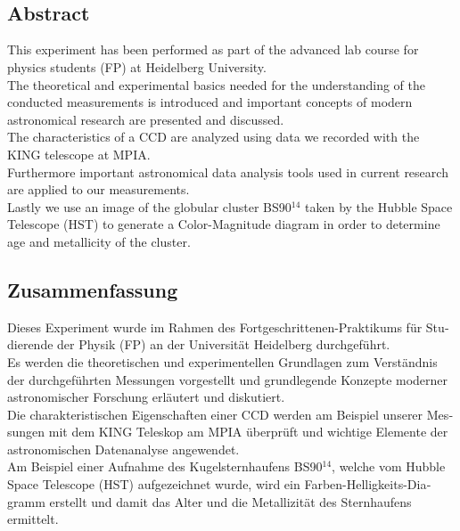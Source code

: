 \makeatletter

\begin{centering}
\textbf{\Large\@title} \\
\vspace{.1cm}
\small\@author \\
\end{centering}

\makeatother

\vfill
 
{\let\raggedsection\centering
\begin{centering}
\section*{Abstract }
\end{centering}
This experiment has been performed as part of the advanced lab course for physics students (FP) at Heidelberg University. \\
The theoretical and experimental basics needed for the understanding of the conducted measurements is introduced and important concepts of modern astronomical research are presented and discussed.\\
The characteristics of a CCD are analyzed using data we recorded with the KING telescope at MPIA. \\
Furthermore important astronomical data analysis tools used in current research are applied to our measurements. \\
Lastly we use an image of the globular cluster BS90$^{14}$ taken by the Hubble Space Telescope (HST) to generate a Color-Magnitude diagram in order to determine age and metallicity of the cluster.


\vfill
\begin{german}
\begin{centering}
\section*{Zusammenfassung}
\end{centering}
Dieses Experiment wurde im Rahmen des Fortgeschrittenen-Praktikums für Studierende der Physik (FP) an der Universität Heidelberg durchgeführt. \\
Es werden die theoretischen und experimentellen Grundlagen zum Verständnis der durchgeführten Messungen vorgestellt und grundlegende Konzepte moderner astronomischer Forschung erläutert und diskutiert. \\
Die charakteristischen Eigenschaften einer CCD werden am Beispiel unserer Messungen mit dem KING Teleskop am MPIA überprüft und wichtige Elemente der astronomischen Datenanalyse angewendet. \\
Am Beispiel einer Aufnahme des Kugelsternhaufens BS90$^{14}$, welche vom Hubble Space Telescope (HST) aufgezeichnet wurde, wird ein Farben-Helligkeits-Diagramm erstellt und damit das Alter und die Metallizität des Sternhaufens ermittelt. 

\end{german}}
\vfill
\blankpage